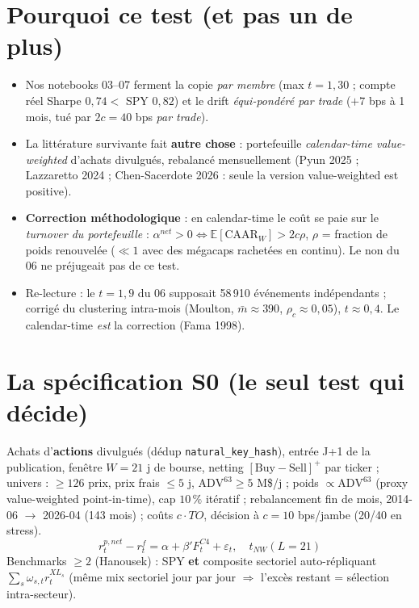 \documentclass[10pt,a4paper,twocolumn]{article}
\begin{document}

\section{Pourquoi ce test (et pas un de plus)}
\begin{itemize}
  \item Nos notebooks 03--07 ferment la copie \emph{par membre} (max $t{=}1{,}30$ ; compte réel Sharpe $0{,}74<$ SPY $0{,}82$) et le drift \emph{équi-pondéré par trade} ($+7$ bps à 1 mois, tué par $2c=40$ bps \emph{par trade}).
  \item La littérature survivante fait \textbf{autre chose} : portefeuille \emph{calendar-time value-weighted} d'achats divulgués, rebalancé mensuellement (Pyun 2025 ; Lazzaretto 2024 ; Chen-Sacerdote 2026 : seule la version value-weighted est positive).
  \item \textbf{Correction méthodologique} : en calendar-time le coût se paie sur le \emph{turnover du portefeuille} : $\alpha^{net}>0 \iff \mathbb{E}[\mathrm{CAAR}_W] > 2c\rho$, $\rho$ = fraction de poids renouvelée ($\ll 1$ avec des mégacaps rachetées en continu). Le \og non\fg{} du 06 ne préjugeait pas de ce test.
  \item Re-lecture : le $t{=}1{,}9$ du 06 supposait 58\,910 événements indépendants ; corrigé du clustering intra-mois (Moulton, $\bar m\approx390$, $\rho_c\approx0{,}05$), $t\approx0{,}4$. Le calendar-time \emph{est} la correction (Fama 1998).
\end{itemize}

\section{La spécification S0 (le seul test qui décide)}
Achats d'\textbf{actions} divulgués (dédup \texttt{natural\_key\_hash}), entrée J+1 de la publication, fenêtre $W=21$ j de bourse, netting $[\mathrm{Buy}-\mathrm{Sell}]^+$ par ticker ; univers : $\geq126$ prix, prix frais $\leq5$ j, $\mathrm{ADV}^{63}\geq5$ M\$/j ; poids $\propto \mathrm{ADV}^{63}$ (proxy value-weighted point-in-time), cap $10\,\%$ itératif ; rebalancement fin de mois, 2014-06 $\to$ 2026-04 (143 mois) ; coûts $c\cdot TO$, décision à $c=10$ bps/jambe (20/40 en stress).
\[
r^{p,net}_t - r^f_t = \alpha + \beta' F^{C4}_t + \varepsilon_t,\quad t_{NW}(L{=}21)
\]
Benchmarks $\geq2$ (Hanousek) : SPY \textbf{et} composite sectoriel auto-répliquant $\sum_s \omega_{s,t} r^{XL_s}_t$ (même mix sectoriel jour par jour $\Rightarrow$ l'excès restant = sélection intra-secteur).
\end{document}
